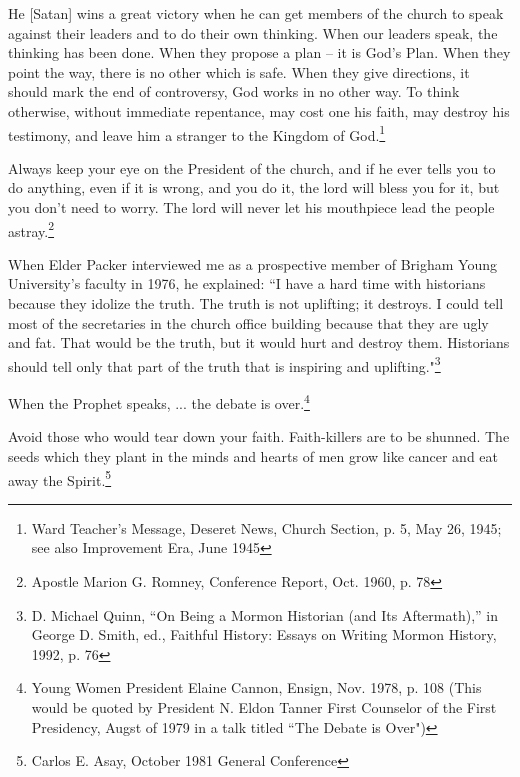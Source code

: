 \begin{displayquote}
He [Satan] wins a great victory when he can get members of the church to speak
against their leaders and to do their own thinking. When our leaders speak, the
thinking has been done. When they propose a plan – it is God's Plan. When they point
the way, there is no other which is safe. When they give directions, it should mark
the end of controversy, God works in no other way. To think otherwise, without 
immediate repentance, may cost one his faith, may destroy his testimony, and leave 
him a stranger to the Kingdom of God.\footnote{
Ward Teacher's Message, Deseret News, Church Section, p. 5, May 26, 1945; see also 
Improvement Era, June 1945
}
\end{displayquote}

\begin{displayquote}
Always keep your eye on the President of the church, and if he ever tells you to do
anything, even if it is wrong, and you do it, the lord will bless you for it, but you
don't need to worry. The lord will never let his mouthpiece lead the people
astray.\footnote{Apostle Marion G. Romney, Conference Report, Oct. 1960, p. 78}
\end{displayquote}

\begin{displayquote}
When Elder Packer interviewed me as a prospective member of Brigham Young
University's faculty in 1976, he explained: ``I have a hard time with historians
because they idolize the truth. The truth is not uplifting; it destroys. I could tell
most of the secretaries in the church office building because that they are ugly and
fat. That would be the truth, but it would hurt and destroy them. Historians should
tell only that part of the truth that is inspiring and uplifting."\footnote{
D. Michael Quinn, “On Being a Mormon Historian (and Its Aftermath),” in George D. 
Smith, ed., Faithful History: Essays on Writing Mormon History, 1992, p. 76
}
\end{displayquote}

\begin{displayquote}
When the Prophet speaks, ... the debate is over.\footnote{Young Women President Elaine 
Cannon, Ensign, Nov. 1978, p. 108 (This would be quoted by President N. Eldon Tanner
  First Counselor of the First Presidency, Augst of 1979 in a talk titled ``The 
  Debate is Over")}
\end{displayquote}

\begin{displayquote}
Avoid those who would tear down your faith. Faith-killers are to be shunned. The
seeds which they plant in the minds and hearts of men grow like cancer and eat
away the Spirit.\footnote{Carlos E. Asay, October 1981 General Conference}
\end{displayquote}

